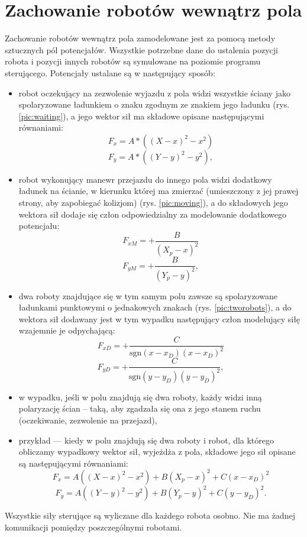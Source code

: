 \section{Zachowanie robotów wewnątrz pola}
	Zachowanie robotów wewnątrz pola zamodelowane jest za pomocą metody sztucznych pól potencjałów.
	Wszystkie potrzebne dane do ustalenia pozycji robota i pozycji innych robotów są symulowane na poziomie programu sterującego.	
	 Potencjały ustalane są w następujący sposób:
	\begin{itemize}
		\item robot oczekujący na zezwolenie wyjazdu z pola widzi wszystkie ściany jako spolaryzowane ładunkiem o znaku zgodnym ze znakiem jego ładunku (rys. \ref{pic:waiting}), a jego wektor sił ma składowe opisane następującymi równaniami:
                  $$F_x= A*((X-x)^2 - x^2)$$
		  $$F_y= A*((Y-y)^2 - y^2),$$
		\item robot wykonujący manewr przejazdu do innego pola widzi dodatkowy ładunek na ścianie, w kierunku której ma zmierzać (umieszczony z jej prawej strony, aby zapobiegać kolizjom) (rys. \ref{pic:moving}), a do składowych jego wektora sił dodaje się człon odpowiedzialny za modelowanie dodatkowego potencjału:
                  $$F_{xM}= +\frac{B}{(X_p-x)^2}$$
                  $$F_{yM}= +\frac{B}{(Y_p-y)^2},$$
		\item dwa roboty znajdujące się w tym samym polu zawsze są spolaryzowane ładunkami punktowymi o jednakowych znakach (rys. \ref{pic:tworobots}), a do wektora sił dodawany jest w tym wypadku następujący człon modelujący siłę wzajemnie je odpychającą:
                  $$F_{xD}= +\frac{C}{\mathrm{sgn}(x-x_D)(x-x_D)^2}$$
                  $$F_{yD}= +\frac{C}{\mathrm{sgn}(y-y_D)(y-y_D)^2},$$ 
		\item w wypadku, jeśli w polu znajdują się dwa roboty, każdy widzi inną polaryzację ścian -- taką, aby zgadzała się ona z jego stanem ruchu (oczekiwanie, zezwolenie na przejazd),
                \item przykład --- kiedy w polu znajdują się dwa roboty i robot, dla którego obliczamy wypadkowy wektor sił, wyjeżdża z pola, składowe jego sił opisane są następującymi równaniami:
                  $$F_x= A((X-x)^2 - x^2)+B(X_p-x)^2+C(x-x_D)^2$$
                  $$F_y= A((Y-y)^2 - y^2)+B(Y_p-y)^2+C(y-y_D)^2.$$ 
	\end{itemize}
	
	Wszystkie siły sterujące są wyliczane dla każdego robota osobno. Nie ma żadnej komunikacji pomiędzy poszczególnymi robotami.
	
